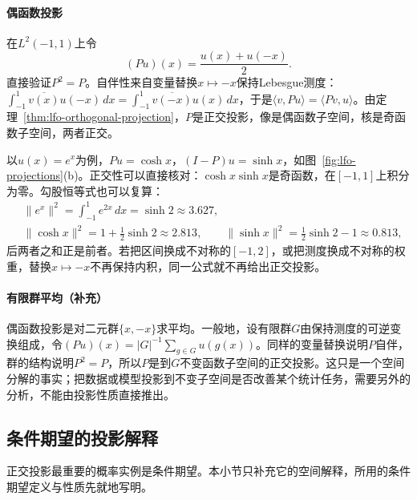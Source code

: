 \paragraph{偶函数投影}
在$L^2(-1,1)$上令
\[
 (Pu)(x)=\frac{u(x)+u(-x)}{2}.
\]
直接验证$P^2=P$。自伴性来自变量替换$x\mapsto-x$保持Lebesgue测度：$\int_{-1}^1\overline{v(x)}u(-x)\,dx=\int_{-1}^1\overline{v(-x)}u(x)\,dx$，于是$\langle v,Pu\rangle=\langle Pv,u\rangle$。由定理~\ref{thm:lfo-orthogonal-projection}，$P$是正交投影，像是偶函数子空间，核是奇函数子空间，两者正交。

以$u(x)=e^x$为例，$Pu=\cosh x$，$(I-P)u=\sinh x$，如图~\ref{fig:lfo-projections}(b)。正交性可以直接核对：$\cosh x\sinh x$是奇函数，在$[-1,1]$上积分为零。勾股恒等式也可以复算：
\[
 \begin{aligned}
 &\|e^x\|^2=\int_{-1}^1e^{2x}\,dx=\sinh2\approx3.627,\\
 &\|\cosh x\|^2=1+\tfrac12\sinh2\approx2.813,\qquad
 \|\sinh x\|^2=\tfrac12\sinh2-1\approx0.813 ,
 \end{aligned}
\]
后两者之和正是前者。若把区间换成不对称的$[-1,2]$，或把测度换成不对称的权重，替换$x\mapsto-x$不再保持内积，同一公式就不再给出正交投影。

\paragraph{有限群平均（补充）}
偶函数投影是对二元群$\{x,-x\}$求平均。一般地，设有限群$G$由保持测度的可逆变换组成，令$(Pu)(x)=|G|^{-1}\sum_{g\in G}u(g(x))$。同样的变量替换说明$P$自伴，群的结构说明$P^2=P$，所以$P$是到$G$不变函数子空间的正交投影。这只是一个空间分解的事实；把数据或模型投影到不变子空间是否改善某个统计任务，需要另外的分析，不能由投影性质直接推出。

\subsection{条件期望的投影解释}
\label{sec:lfo-conditional-expectation}

正交投影最重要的概率实例是条件期望。本小节只补充它的空间解释，所用的条件期望定义与性质先就地写明。

